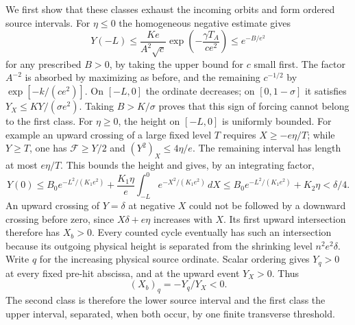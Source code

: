 We first show that these classes exhaust the incoming orbits and form
ordered source intervals.
For $\eta\le0$ the homogeneous negative estimate gives
\begin{equation}\label{eq:simple-small-forcing-entry}
 Y(-L)\le\frac{K e}{A^2\sqrt c}
        \exp\left(-\frac{\gamma T_A}{ce^2}\right)
                  \le e^{-B/e^2}
\end{equation}
for any prescribed $B>0$, by taking the upper bound for $c$ small first.
The factor $A^{-2}$ is absorbed by maximizing as before, and the
remaining $c^{-1/2}$ by $\exp[-k/(ce^2)]$.
On $[-L,0]$ the ordinate decreases; on $[0,1-\sigma]$ it satisfies
$Y_X\le K Y/(\sigma e^2)$.
Taking $B>K/\sigma$ proves that this sign of forcing cannot belong
to the first class.
For $\eta\ge0$, the height on $[-L,0]$ is uniformly bounded.
For example an upward crossing of a large fixed level $T$ requires
$X\ge-e\eta/T$; while $Y\ge T$, one has
$\mathcal F\ge Y/2$ and $(Y^2)_X\le4\eta/e$.
The remaining interval has length at most $e\eta/T$.
This bounds the height and gives, by an integrating factor,
\[
 Y(0)\le B_0e^{-L^2/(K_1e^2)}
                +\frac{K_1\eta}{e}
                     \int_{-L}^0e^{-X^2/(K_1e^2)}\,dX
       \le B_0e^{-L^2/(K_1e^2)}+K_2\eta<\delta/4.
\]
An upward crossing of $Y=\delta$ at negative $X$ could not be
followed by a downward crossing before zero, since
$X\delta+e\eta$ increases with $X$.
Its first upward intersection therefore has $X_b>0$.
Every counted cycle eventually has such an intersection because its
outgoing physical height is separated from the shrinking level
$n^2e^2\delta$. Write $q$ for the increasing physical source ordinate.
Scalar ordering gives $Y_q>0$ at every fixed pre-hit abscissa, and at
the upward event $Y_X>0$. Thus
\[
 (X_b)_q=-Y_q/Y_X<0.
\]
The second class is therefore the lower source interval and the first
class the upper interval, separated, when both occur, by one finite
transverse threshold.

